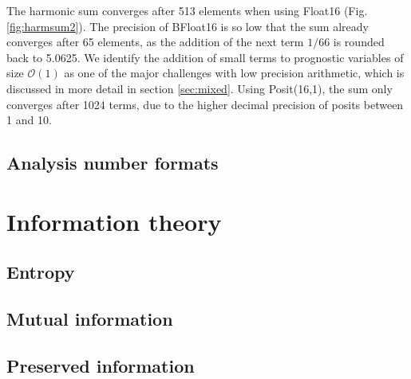%
%

The harmonic sum converges after 513 elements when using Float16 (Fig. \ref{fig:harmsum2}). The precision of BFloat16
is so low that the sum already converges after 65 elements, as the addition of the next term $1/66$ is rounded back to
5.0625. We identify the addition of small terms to prognostic variables of size $\mathcal{O}(1)$ as one of the major challenges
with low precision arithmetic, which is discussed in more detail in section \ref{sec:mixed}. Using Posit(16,1), the sum only converges
after 1024 terms, due to the higher decimal precision of posits between 1 and 10.

\subsection{Analysis number formats}

\section{Information theory}
\label{sec:information}

\subsection{Entropy}
\label{sec:entropy}

\subsection{Mutual information}
\label{sec:mutual_information}

\subsection{Preserved information}
\label{sec:preserved_information}


